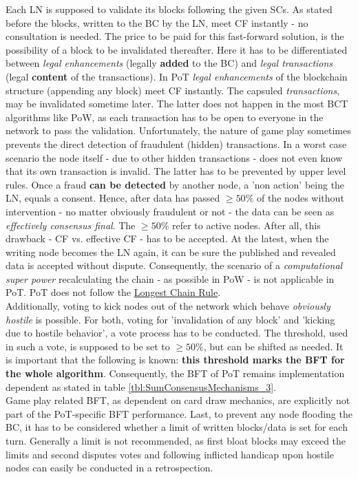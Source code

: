 Each \gls{LN} is supposed to validate its blocks following the given \gls{SC}s.
As stated before the blocks, written to the \gls{BC} by the \gls{LN}, meet \gls{CF} instantly - no consultation is needed.
The price to be paid for this fast-forward solution, is the possibility of a block to be invalidated thereafter.
Here it has to be differentiated between \textit{legal enhancements} (legally \textbf{added} to the \gls {BC})
and \textit{legal transactions} (legal \textbf{content} of the transactions).
In \gls{PoT} \textit{legal enhancements} of the blockchain structure (appending any block) meet \gls{CF} instantly.
The capsuled \textit{transactions}, may be invalidated sometime later.
The latter does not happen in the most \gls{BCT} algorithms like \gls{PoW}, as each transaction has to be open to everyone in the network to  pass the validation.
Unfortunately, the nature of game play sometimes prevents the direct detection of fraudulent (hidden) transactions.
In a worst case scenario the node itself - due to other hidden transactions - does not even know that its own transaction is invalid.
The latter has to be prevented by upper level rules.
Once a fraud \textbf{can be detected} by another node, a 'non action' being the \gls{LN}, equals a consent.
Hence, after data has passed $\geq 50\%$ of the nodes without intervention - no matter obviously fraudulent or not - the data can be seen as \textit{effectively consensus final}.
The $\geq 50\%$ refer to active nodes.
After all, this drawback - \gls{CF} vs. effective \gls{CF} - has to be accepted.
At the latest, when the writing node becomes the \gls{LN} again, it can be sure the published and revealed data is accepted without dispute.
Consequently, the scenario of a \textit{computational super power} recalculating the
chain - as possible in \gls{PoW} \cite[8]{Nakamoto.2009} - is not applicable in \gls{PoT}.
\gls{PoT} does not follow the \hyperref[LongestChainRule]{Longest Chain Rule}.\\
Additionally, voting to kick nodes out of the network which behave \textit{obviously hostile} is possible.
For both, voting for 'invalidation of any block' and 'kicking due to hostile behavior', a vote process has to be conducted.
The threshold, used in such a vote, is supposed to be set to $\geq 50\%$, but can be shifted as needed.
It is important that the following is known: \textbf{this threshold marks the \gls{BFT} for the whole algorithm}.
Consequently, the \gls{BFT} of \gls{PoT} remains implementation dependent as stated in table \ref{tbl:SumConsensusMechanisms_3}. \\
Game play related \gls{BFT}, as dependent on card draw mechanics, are explicitly not part of the \gls{PoT}-specific \gls{BFT} performance.
Last, to prevent any node flooding the \gls{BC}, it has to be considered whether a limit of written blocks/data is set for each turn.
Generally a limit is not recommended, as first bloat blocks may exceed the limits and
second disputes votes and following inflicted handicap upon hostile nodes can easily be conducted in a retrospection.



